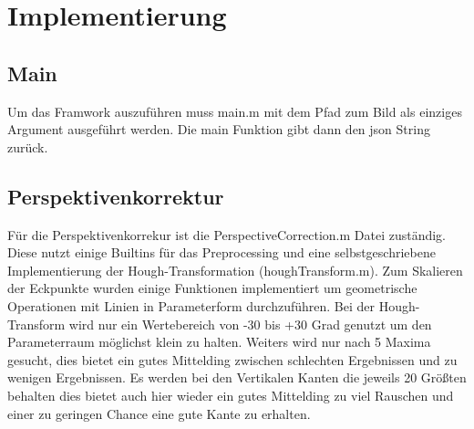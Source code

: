 \documentclass[paper=A4, deutsch]{scrartcl}
\begin{document}

\section{Implementierung}
\subsection{Main}
Um das Framwork auszuführen muss main.m mit dem Pfad zum Bild als einziges Argument ausgeführt werden. Die main Funktion gibt dann den json String zurück.
\subsection{Perspektivenkorrektur}
Für die Perspektivenkorrekur ist die PerspectiveCorrection.m Datei zuständig. Diese nutzt einige Builtins für das Preprocessing und eine selbstgeschriebene Implementierung der Hough-Transformation (houghTransform.m). Zum Skalieren der Eckpunkte wurden einige Funktionen implementiert um geometrische Operationen mit Linien in Parameterform durchzuführen. Bei der Hough-Transform wird nur ein Wertebereich von -30 bis +30 Grad genutzt um den Parameterraum möglichst klein zu halten. Weiters wird nur nach 5 Maxima gesucht, dies bietet ein gutes Mittelding zwischen schlechten Ergebnissen und zu wenigen Ergebnissen. Es werden bei den Vertikalen Kanten die jeweils 20 Größten behalten dies bietet auch hier wieder ein gutes Mittelding zu viel Rauschen und einer zu geringen Chance eine gute Kante zu erhalten.
\end{document}

